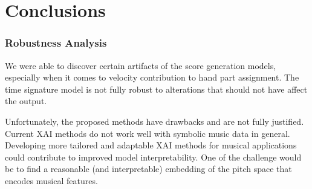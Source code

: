 \chapter{Conclusions}

\subsection{Robustness Analysis}

We were able to discover certain artifacts of the score generation models, especially when it comes to velocity contribution to hand part assignment. The time signature model is not fully robust to alterations that should not have affect the output.

Unfortunately, the proposed methods have drawbacks and are not fully justified. Current XAI methods do not work well with symbolic music data in general. Developing more tailored and adaptable XAI methods for musical applications could contribute to improved model interpretability. One of the challenge would be to find a reasonable (and interpretable) embedding of the pitch space that encodes musical features. 
